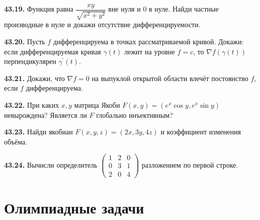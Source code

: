 \noindent\begin{minipage}[t]{\linewidth}\textbf{43.19.}\starmark{} Функция равна \(\dfrac{xy}{\sqrt{x^2+y^2}}\) вне нуля и \(0\) в нуле. Найди частные производные в нуле и докажи отсутствие дифференцируемости.\par\end{minipage}\par
\noindent\begin{minipage}[t]{\linewidth}\textbf{43.20.}\starmark{} Пусть \(f\) дифференцируема в точках рассматриваемой кривой. Докажи: если дифференцируемая кривая \(\gamma(t)\) лежит на уровне \(f=c\), то \(\nabla f(\gamma(t))\) перпендикулярен \(\gamma^{\prime}(t)\).\par\end{minipage}\par
\noindent\begin{minipage}[t]{\linewidth}\textbf{43.21.}\starmark{} Докажи, что \(\nabla f=0\) на выпуклой открытой области влечёт постоянство \(f\), если \(f\) дифференцируема.\par\end{minipage}\par
\noindent\begin{minipage}[t]{\linewidth}\textbf{43.22.}\starmark{} При каких \(x,y\) матрица Якоби \(F(x,y)=(e^x\cos y,e^x\sin y)\) невырождена? Является ли \(F\) глобально инъективным?\par\end{minipage}\par
\noindent\begin{minipage}[t]{\linewidth}\textbf{43.23.} Найди якобиан \(F(x,y,z)=(2x,3y,4z)\) и коэффициент изменения объёма.\par\end{minipage}\par
\noindent\begin{minipage}[t]{\linewidth}\textbf{43.24.} Вычисли определитель \(\begin{pmatrix}1&2&0\\0&3&1\\2&0&4\end{pmatrix}\) разложением по первой строке.\par\end{minipage}\par
\par{}\section*{Олимпиадные задачи}
